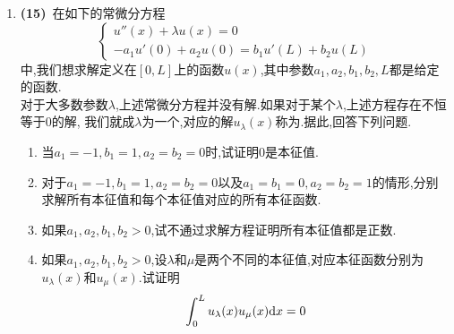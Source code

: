\documentclass{ctexart}
\begin{document}
\begin{enumerate}[leftmargin=*,label=\textbf{\arabic*.}]
    \item \textbf{(15)}\ 在如下的常微分方程
        \[\left\{\begin{array}{l}
            u''(x)+\lambda u(x)=0\\
            -a_1u'(0)+a_2u(0)=b_1u'(L)+b_2u(L)
        \end{array}\right.\]
        中,我们想求解定义在$[0,L]$上的函数$u(x)$,其中参数$a_1,a_2,b_1,b_2,L$都是给定的函数.\\
        对于大多数参数$\lambda$,上述常微分方程并没有解.如果对于某个$\lambda$,上述方程存在不恒等于$0$的解,%
        我们就成$\lambda$为一个,对应的解$u_\lambda(x)$称为.据此,回答下列问题.
        \begin{enumerate}[label=\tbf{(\arabic*)}]
            \item 当$a_1=-1,b_1=1,a_2=b_2=0$时,试证明$0$是本征值.
            \item 对于$a_1=-1,b_1=1,a_2=b_2=0$以及$a_1=b_1=0,a_2=b_2=1$的情形,分别求解所有本征值和每个本征值对应的所有本征函数.
            \item 如果$a_1,a_2,b_1,b_2>0$,试不通过求解方程证明所有本征值都是正数.
            \item 如果$a_1,a_2,b_1,b_2>0$,设$\lambda$和$\mu$是两个不同的本征值,对应本征函数分别为$u_\lambda(x)$和$u_\mu(x)$.试证明
                \[\int_0^Lu_\lambda(x)u_\mu(x)\mathrm{d} x=0\]

        \end{enumerate}
\end{enumerate}
\end{document}
